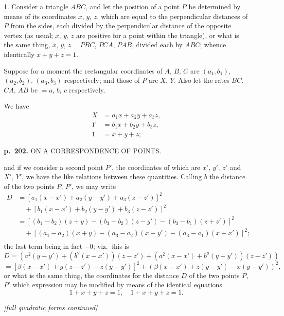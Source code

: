 \documentclass[11pt,a4paper]{book}
\begin{document}
1. Consider a triangle $ABC$, and let the position of a point $P$ be determined by means of its coordinates $x$, $y$, $z$, which are equal to the perpendicular distances of $P$ from the sides, each divided by the perpendicular distance of the opposite vertex (as usual; $x$, $y$, $z$ are positive for a point within the triangle), or what is the same thing, $x$, $y$, $z = PBC$, $PCA$, $PAB$, divided each by $ABC$; whence identically $x + y + z = 1$.

Suppose for a moment the rectangular coordinates of $A$, $B$, $C$ are $(a_1, b_1)$, $(a_2, b_2)$, $(a_3, b_3)$ respectively; and those of $P$ are $X$, $Y$.  Also let the rates $BC$, $CA$, $AB$ be $= a$, $b$, $c$ respectively.

We have
\begin{align*}
X &= a_1 x + a_2 y + a_3 z, \\
Y &= b_1 x + b_2 y + b_3 z, \\
1 &= x + y + z;
\end{align*}

\clearpage

\noindent
\textbf{p.~202.}  ON A CORRESPONDENCE OF POINTS.

and if we consider a second point $P'$, the coordinates of which are $x'$, $y'$, $z'$ and $X'$, $Y'$, we have the like relations between these quantities.  Calling $b$ the distance of the two points $P$, $P'$, we may write
\begin{align*}
D &= [a_1(x - x') + a_2(y - y') + a_3(z - z')]^2 \\
&\quad + [b_1(x - x') + b_2(y - y') + b_3(z - z')]^2 \\
&= [(b_1 - b_2)(z + y) - (b_3 - b_2)(z - y') - (b_3 - b_1)(z + z')]^2 \\
&\quad + [(a_1 - a_2)(x + y) - (a_3 - a_2)(x - y') - (a_3 - a_1)(x + x')]^2; \\
\end{align*}
the last term being in fact $-0$; viz.\ this is
\[
D = (a^2 (y - y') + (b^2(x - x'))(z - z') + (a^2 (x - x') + b^2(y - y'))(z - z'))
\]
\[
= [\beta(x - x') + y(z - z') - z(y - y')]^2 + (\beta(x - x') + z(y - y') - x(y - y'))^2,
\]
or what is the same thing, the coordinates for the distance $D$ of the two points $P$, $P'$ which expression may be modified by means of the identical equations
\[
1 + x + y + z = 1, \quad 1 + x + y + z = 1.
\]

\textit{[full quadratic forms continued]}

\end{document}
